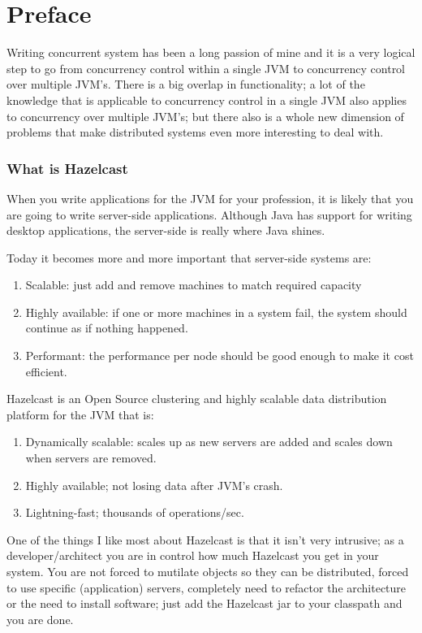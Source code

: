 \chapter*{Preface}

Writing concurrent system has been a long passion of mine and it is a very logical step to go from concurrency control within a single JVM to concurrency control over multiple JVM's. There is a big overlap in functionality; a lot of the knowledge that is applicable to concurrency control in a single JVM also applies to concurrency over multiple JVM's; but there also is a whole new dimension of problems that make distributed systems even more interesting to deal with. 

\subsection*{What is Hazelcast}
When you write applications for the JVM for your profession, it is likely that you are going to write server-side applications. Although Java has support for writing desktop applications, the server-side is really where Java shines.

Today it becomes more and more important that server-side systems are:
\begin{enumerate}
\item Scalable: just add and remove machines to match required capacity 
\item Highly available: if one or more machines in a system fail, the system should continue as if nothing happened.
\item Performant: the performance per node should be good enough to make it cost efficient.
\end{enumerate}

Hazelcast is an Open Source clustering and highly scalable data distribution platform for the JVM that is:
\begin{enumerate}
\item Dynamically scalable: scales up as new servers are added and scales down when servers are removed.
\item Highly available; not losing data after JVM's crash.
\item Lightning-fast; thousands of operations/sec.
\end{enumerate}
One of the things I like most about Hazelcast is that it isn't very intrusive; as a developer/architect you are in control how much Hazelcast you get in your system. You are not forced to mutilate objects so they can be distributed, forced to use specific (application) servers, completely need to refactor the architecture or the need to install software; just add the Hazelcast jar to your classpath and you are done.

